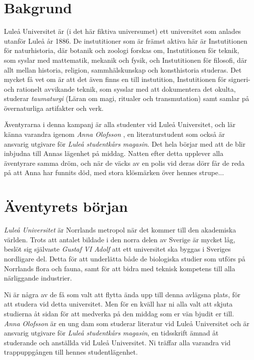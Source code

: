 \section{Bakgrund}
Luleå Universitet är (i det här fiktiva universumet) ett universitet som anlades utanför Luleå år 1886. De instutitioner som är främst aktiva här är Instutitionen för naturhistoria, där botanik och zoologi forskas om, Instutitionen för teknik, som syslar med mattematik, mekanik och fysik, och Instutitionen för filosofi, där allt mellan historia, religion, sammhälskunskap och konsthistoria studeras. Det mycket få vet om är att det även finns en till instutition, Instutitionen för signeri- och rationelt avvikande teknik, som sysslar med att dokumentera det okulta, studerar \textit{taumaturgi} (Läran om magi, ritualer och transmutation) samt samlar på övernaturliga artifakter och verk.

Äventyrarna i denna kampanj är alla studenter vid Luleå Universitet, och lär känna varandra igenom \textit{Anna Olofsson} \sectiondescribe{\ref{kar:AnnaOlofsson}}, en literaturstudent som också är ansvarig utgivare för \textit{Luleå studentkårs magasin}. Det hela börjar med att de blir inbjudna till Annas lägenhet på middag. Natten efter detta upplever alla äventyrare samma dröm, och när de väcks av en polis vid deras dörr får de reda på att Anna har funnits död, med stora klösmärken över hennes strupe...

\section{Äventyrets början}

\begin{displayquote}
	\textit{Luleå Universitet} är Norrlands metropol när det kommer till den akademiska världen. Trots att antalet bildade i den norra delen av Sverige är mycket låg, beslöt sig självaste \textit{Gustaf VI Adolf} att ett universitet ska byggas i Sveriges nordligare del. Detta för att underlätta både de biologiska studier som utförs på Norrlands flora och fauna, samt för att bidra med teknisk kompetens till alla närliggande industrier.

	Ni är några av de få som valt att flytta ända upp till denna avlägsna plats, för att studera vid detta universitet. Men för en kväll har ni alla valt att skjuta studierna åt sidan för att medverka på den middag som er vän bjudit er till. \textit{Anna Olofsson} är en ung dam som studerar literatur vid Luleå Universitet och är ansvarig utgivare för \textit{Luleå studentkårs magasin}, en tidsskrift ämnad åt studerande och anställda vid Luleå Universitet. Ni träffar alla varandra vid trappuppgången till hennes studentlägenhet.
\end{displayquote}

